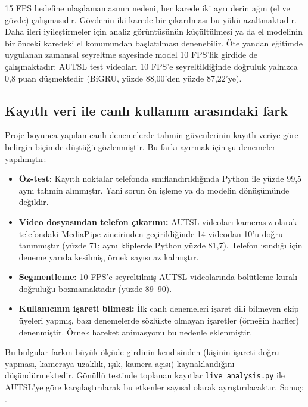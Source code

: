15 FPS hedefine ulaşılamamasının nedeni, her karede iki ayrı derin ağın (el ve gövde)
çalışmasıdır. Gövdenin iki karede bir çıkarılması bu yükü azaltmaktadır. Daha ileri
iyileştirmeler için analiz görüntüsünün küçültülmesi ya da el modelinin bir önceki
karedeki el konumundan başlatılması denenebilir. Öte yandan eğitimde uygulanan zamansal
seyreltme sayesinde model 10 FPS'lik girdide de çalışmaktadır: AUTSL test videoları
10 FPS'e seyreltildiğinde doğruluk yalnızca 0,8 puan düşmektedir (BiGRU, yüzde 88,00'den
yüzde 87,22'ye).

\subsection{Kayıtlı veri ile canlı kullanım arasındaki fark}

Proje boyunca yapılan canlı denemelerde tahmin güvenlerinin kayıtlı veriye göre
belirgin biçimde düştüğü gözlenmiştir. Bu farkı ayırmak için şu denemeler yapılmıştır:

\begin{itemize}
  \item \textbf{Öz-test:} Kayıtlı noktalar telefonda sınıflandırıldığında Python ile
        yüzde 99,5 aynı tahmin alınmıştır. Yani sorun ön işleme ya da modelin
        dönüşümünde değildir.
  \item \textbf{Video dosyasından telefon çıkarımı:} AUTSL videoları kamerasız olarak
        telefondaki MediaPipe zincirinden geçirildiğinde 14 videodan 10'u doğru
        tanınmıştır (yüzde 71; aynı kliplerde Python yüzde 81,7). Telefon ısındığı için
        deneme yarıda kesilmiş, örnek sayısı az kalmıştır.
  \item \textbf{Segmentleme:} 10 FPS'e seyreltilmiş AUTSL videolarında bölütleme
        kuralı doğruluğu bozmamaktadır (yüzde 89--90).
  \item \textbf{Kullanıcının işareti bilmesi:} İlk canlı denemeleri işaret dili
        bilmeyen ekip üyeleri yapmış, bazı denemelerde sözlükte olmayan işaretler
        (örneğin harfler) denenmiştir. Örnek hareket animasyonu bu nedenle eklenmiştir.
\end{itemize}

Bu bulgular farkın büyük ölçüde girdinin kendisinden (kişinin işareti doğru yapması,
kameraya uzaklık, ışık, kamera açısı) kaynaklandığını düşündürmektedir. Gönüllü
testinde toplanan kayıtlar \texttt{live\_analysis.py} ile AUTSL'ye göre karşılaştırılarak
bu etkenler sayısal olarak ayrıştırılacaktır. Sonuç: .

